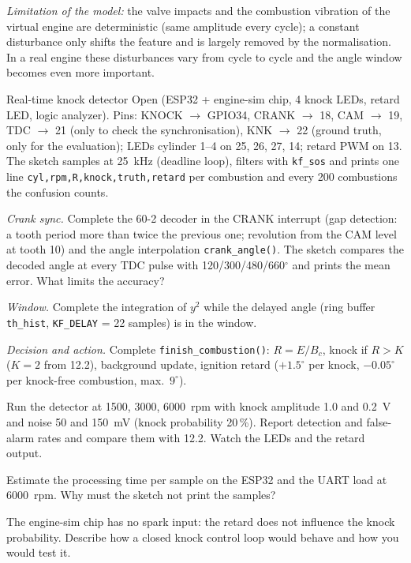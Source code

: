 \begin{solution}
\emph{Limitation of the model:} the valve impacts and the combustion vibration of the
virtual engine are deterministic (same amplitude every cycle); a constant disturbance
only shifts the feature and is largely removed by the normalisation. In a real engine
these disturbances vary from cycle to cycle and the angle window becomes even more
important.
\end{solution}

\begin{exercise}{Real-time knock detector}{\Wokwi}
\sloppy
Open  (ESP32 + engine-sim chip, 4 knock LEDs,
retard LED, logic analyzer). Pins: KNOCK $\to$ GPIO34, CRANK $\to$ 18, CAM $\to$ 19,
TDC $\to$ 21 (only to check the synchronisation), KNK $\to$ 22 (ground truth, only for the
evaluation); LEDs cylinder 1--4 on 25, 26, 27, 14; retard PWM on 13. The sketch samples at
\SI{25}{kHz} (deadline loop), filters with \texttt{kf\_sos} and prints one line
\texttt{cyl,rpm,R,knock,truth,retard} per combustion and every 200 combustions the
confusion counts.
\begin{tasks}
  \item \emph{Crank sync.} Complete the 60-2 decoder in the CRANK interrupt (gap
    detection: a tooth period more than twice the previous one; revolution from the CAM
    level at tooth 10) and the angle interpolation \texttt{crank\_angle()}. The sketch
    compares the decoded angle at every TDC pulse with 120/300/480/660$^\circ$ and prints
    the mean error. What limits the accuracy?
  \item \emph{Window.} Complete the integration of $y^2$ while the delayed angle (ring
    buffer \texttt{th\_hist}, \texttt{KF\_DELAY} = 22 samples) is in the window.
  \item \emph{Decision and action.} Complete \texttt{finish\_combustion()}:
    $R=E/B_c$, knock if $R>K$ ($K=2$ from 12.2), background update, ignition retard
    ($+1.5^\circ$ per knock, $-0.05^\circ$ per knock-free combustion, max.\ $9^\circ$).
  \item Run the detector at 1500, 3000, \SI{6000}{rpm} with knock amplitude 1.0 and
    \SI{0.2}{V} and noise 50 and \SI{150}{mV} (knock probability 20\,\%). Report detection
    and false-alarm rates and compare them with 12.2. Watch the LEDs and the retard
    output.
  \item Estimate the processing time per sample on the ESP32 and the UART load at
    \SI{6000}{rpm}. Why must the sketch not print the samples?
  \item The engine-sim chip has no spark input: the retard does not influence the knock
    probability. Describe how a closed knock control loop would behave and how you would
    test it.
\end{tasks}
\end{exercise}

